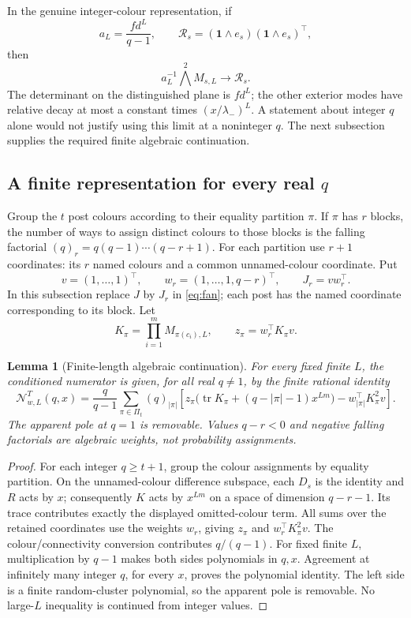 \documentclass[11pt,a4paper]{article}
\newtheorem{lemma}[theorem]{Lemma}
\theoremstyle{remark}\newtheorem{remark}[theorem]{Remark}
\DeclareMathOperator{\tr}{tr}\DeclareMathOperator{\diag}{diag}
\newcommand{\one}{\mathbf 1}\newcommand{\N}{\mathcal N}
\newcommand{\R}{\mathcal R}\newcommand{\CC}{\mathcal C}
\begin{document}
In the genuine integer-colour representation, if
\[
a_L=\frac{fd^L}{q-1},\qquad \R_s=(\one\wedge e_s)(\one\wedge e_s)^\top,
\]
then
\begin{equation}\label{eq:wedge-limit}
a_L^{-1}\bigwedge^2 M_{s,L}\longrightarrow\R_s.
\end{equation}
The determinant on the distinguished plane is $fd^L$; the other exterior modes have relative decay at most a constant times $(x/\lambda_-)^L$.
A statement about integer $q$ alone would not justify using this limit at a noninteger $q$. The next subsection supplies the required finite algebraic continuation.

\subsection{A finite representation for every real $q$}\label{sec:continuation}
Group the $t$ post colours according to their equality partition $\pi$. If $\pi$ has $r$ blocks, the number of ways to assign distinct colours to those blocks is the falling factorial $(q)_r=q(q-1)\cdots(q-r+1)$.
For each partition use $r+1$ coordinates: its $r$ named colours and a common unnamed-colour coordinate. Put
\[
v=(1,\ldots,1)^\top,\qquad w_r=(1,\ldots,1,q-r)^\top,
\qquad J_r=vw_r^\top.
\]
In this subsection replace $J$ by $J_r$ in \eqref{eq:fan}; each post has the named coordinate corresponding to its block. Let
\[
K_\pi=\prod_{i=1}^m M_{\pi(c_i),L},\qquad z_\pi=w_r^\top K_\pi v.
\]
\begin{lemma}[Finite-length algebraic continuation]\label{lem:finite}
For every fixed finite $L$, the conditioned numerator is given, for all real $q\ne1$, by the finite rational identity
\begin{equation}\label{eq:finite}
\N_{w,L}^{T}(q,x)=\frac q{q-1}\sum_{\pi\in\Pi_t}(q)_{|\pi|}
\left[z_\pi\big(\tr K_\pi+(q-|\pi|-1)x^{Lm}\big)
-w_{|\pi|}^\top K_\pi^2v\right].
\end{equation}
The apparent pole at $q=1$ is removable. Values $q-r<0$ and negative falling factorials are algebraic weights, not probability assignments.
\end{lemma}
\begin{proof}
For each integer $q\ge t+1$, group the colour assignments by equality partition. On the unnamed-colour difference subspace, each $D_s$ is the identity and $R$ acts by $x$; consequently $K$ acts by $x^{Lm}$ on a space of dimension $q-r-1$. Its trace contributes exactly the displayed omitted-colour term. All sums over the retained coordinates use the weights $w_r$, giving $z_\pi$ and $w_r^\top K_\pi^2v$. The colour/connectivity conversion contributes $q/(q-1)$. For fixed finite $L$, multiplication by $q-1$ makes both sides polynomials in $q,x$. Agreement at infinitely many integer $q$, for every $x$, proves the polynomial identity. The left side is a finite random-cluster polynomial, so the apparent pole is removable. No large-$L$ inequality is continued from integer values.
\end{proof}
\end{document}
